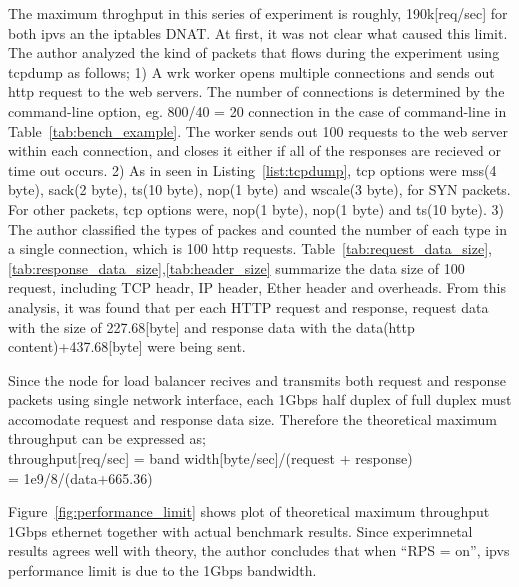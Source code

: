 The maximum throghput in this series of experiment is roughly, 190k[req/sec] for both ipvs an the iptables DNAT.
At first, it was not clear what caused this limit.
The author analyzed the kind of packets that flows during the experiment using tcpdump\cite{jacobson1989tcpdump} as follows;
1) A wrk worker opens multiple connections and sends out http request to the web servers. The number of connections is determined by the command-line option, eg. 800/40 = 20 connection in the case of command-line in Table~\ref{tab:bench_example}. The worker sends out 100 requests to the web server within each connection, and closes it either if all of the responses are recieved or time out occurs.
2) As in seen in Listing~\ref{list:tcpdump}, tcp options were mss(4 byte), sack(2 byte), ts(10 byte), nop(1 byte) and wscale(3 byte), for SYN packets. For other packets, tcp options were, nop(1 byte), nop(1 byte) and ts(10 byte).
3) The author classified the types of packes and counted the number of each type in a single connection, which is 100 http requests. Table~\ref{tab:request_data_size},\ref{tab:response_data_size},\ref{tab:header_size} summarize the data size of 100 request, including TCP headr, IP header, Ether header and overheads. 
From this analysis, it was found that per each HTTP request and response,
request data with the size of 227.68[byte] and response data with the data(http content)+437.68[byte] were being sent.   

Since the node for load balancer recives and transmits both request and response packets using single network interface, each 1Gbps half duplex of full duplex must accomodate request and response data size.
Therefore the theoretical maximum throughput can be expressed as; \\
throughput[req/sec] = band width[byte/sec]/(request + response) \\
= 1e9/8/(data+665.36)

Figure~\ref{fig:performance_limit} shows plot of theoretical maximum throughput 1Gbps ethernet together with actual benchmark results.
Since experimnetal results agrees well with theory, the author concludes that when \enquote{RPS = on}, ipvs performance limit is due to the 1Gbps bandwidth.


